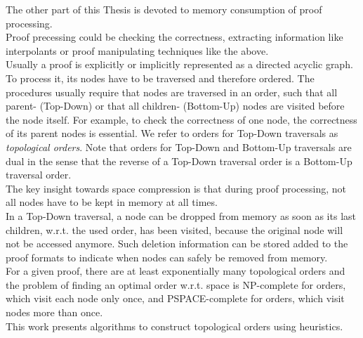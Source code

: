 The other part of this Thesis is devoted to memory consumption of proof processing.\\
Proof precessing could be checking the correctness, extracting information like interpolants or proof manipulating techniques like the above.\\
Usually a proof is explicitly or implicitly represented as a directed acyclic graph.
To process it, its nodes have to be traversed and therefore ordered.
The procedures usually require that nodes are traversed in an order, such that all parent- (Top-Down) or that all children- (Bottom-Up) nodes are visited before the node itself.
For example, to check the correctness of one node, the correctness of its parent nodes is essential. 
We refer to orders for Top-Down traversals as \emph{topological orders}. Note that orders for Top-Down and Bottom-Up traversals are dual in the sense that the reverse of a Top-Down traversal order is a Bottom-Up traversal order.\\
The key insight towards space compression is that during proof processing, not all nodes have to be kept in memory at all times.\\
In a Top-Down traversal, a node can be dropped from memory as soon as its last children, w.r.t. the used order, has been visited, because the original node will not be accessed anymore.
Such deletion information can be stored added to the proof formats to indicate when nodes can safely be removed from memory.\\
For a given proof, there are at least exponentially many topological orders and the problem of finding an optimal order w.r.t. space is NP-complete \cite{TODO} for orders, which visit each node only once, and PSPACE-complete \cite{TODO} for orders, which visit nodes more than once.\\
This work presents algorithms to construct topological orders using heuristics.



